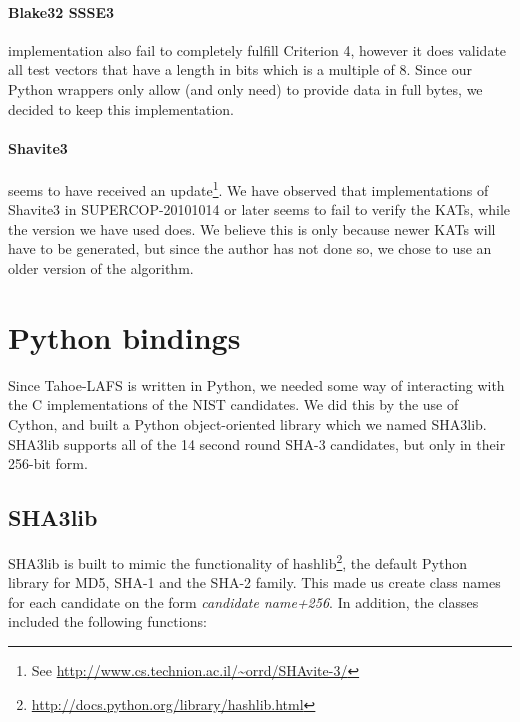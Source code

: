 \documentclass[english,12pt,a4paper]{book}
\begin{document}
\paragraph{Blake32 \ac{SSSE3}} implementation also fail to completely fulfill
Criterion 4, however it does validate all test vectors that have a length
in bits which is a multiple of 8. Since our Python wrappers only allow (and
only need) to provide data in full bytes, we decided to keep this
implementation.

\paragraph{Shavite3} seems to have received an update\footnote{See
\url{http://www.cs.technion.ac.il/~orrd/SHAvite-3/}}. We have observed that
implementations of Shavite3 in \ac{SUPERCOP}-20101014 or later seems to fail to
verify the \acp{KAT}, while the version we have used does. We believe this is
only because newer \acp{KAT} will have to be generated, but since the author
has not done so, we chose to use an older version of the algorithm.

\section{Python bindings}

Since Tahoe-\ac{LAFS} is written in Python, we needed some way of interacting
with the C implementations of the \ac{NIST} candidates. We did this by the use of
Cython, and built a Python object-oriented library which we named SHA3lib.
SHA3lib supports all of the 14 second round \ac{SHA}-3 candidates, but only in
their 256-bit form.

\subsection{SHA3lib}

SHA3lib is built to mimic the functionality of
hashlib\footnote{\url{http://docs.python.org/library/hashlib.html}}, the
default Python library for MD5, \ac{SHA}-1 and the \ac{SHA}-2 family. This
made us create class names for each candidate on the form
\emph{candidate name+256}. In addition, the classes included the following
functions:

\end{document}
